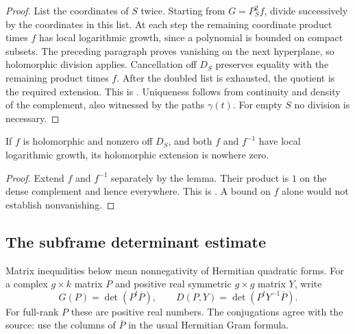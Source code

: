 \begin{proof}
List the coordinates of \(S\) twice.
Starting from \(G=P_S^2f\), divide successively by the coordinates
in this list.
At each step the remaining coordinate product times \(f\)
has local logarithmic growth, since a polynomial is bounded
on compact subsets.
The preceding paragraph proves vanishing on the next hyperplane,
so holomorphic division applies.
Cancellation off \(D_S\) preserves equality with the remaining
product times \(f\).
After the doubled list is exhausted, the quotient is the
required extension.
This is .
Uniqueness follows from continuity and density of the complement,
also witnessed by the paths \(\gamma(t)\).
For empty \(S\) no division is necessary.
\end{proof}

\begin{srcorollary}
\label{cor:faithful-log-growth-unit}
If \(f\) is holomorphic and nonzero off \(D_S\), and both \(f\)
and \(f^{-1}\) have local logarithmic growth, its holomorphic
extension is nowhere zero.
\end{srcorollary}
\begin{proof}
Extend \(f\) and \(f^{-1}\) separately by the lemma.
Their product is \(1\) on the dense complement and hence everywhere.
This is .
A bound on \(f\) alone would not establish nonvanishing.
\end{proof}

\subsection{The subframe determinant estimate}
Matrix inequalities below mean nonnegativity of Hermitian quadratic
forms. For a complex \(g\times k\) matrix \(P\) and positive real
symmetric \(g\times g\) matrix \(Y\), write
\[
 G(P)=\det(P^t\overline P),\qquad
 D(P,Y)=\det(P^tY^{-1}\overline P).
 \tag{BG3}\label{eq:faithful-subframe-determinants}
\]
For full-rank \(P\) these are positive real numbers.
The conjugations agree with the source: use the columns of
\(\overline P\) in the usual Hermitian Gram formula.

